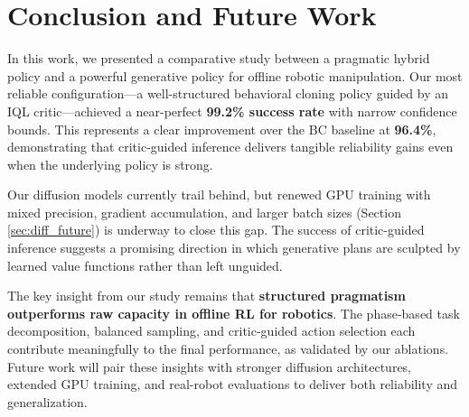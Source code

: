 \documentclass[conference]{IEEEtran}
\begin{document}
\section{Conclusion and Future Work}

In this work, we presented a comparative study between a pragmatic hybrid policy and a powerful generative policy for offline robotic manipulation. Our most reliable configuration---a well-structured behavioral cloning policy guided by an IQL critic---achieved a near-perfect \textbf{99.2\% success rate} with narrow confidence bounds. This represents a clear improvement over the BC baseline at \textbf{96.4\%}, demonstrating that critic-guided inference delivers tangible reliability gains even when the underlying policy is strong.

Our diffusion models currently trail behind, but renewed GPU training with mixed precision, gradient accumulation, and larger batch sizes (Section \ref{sec:diff_future}) is underway to close this gap. The success of critic-guided inference suggests a promising direction in which generative plans are sculpted by learned value functions rather than left unguided.

The key insight from our study remains that \textbf{structured pragmatism outperforms raw capacity in offline RL for robotics}. The phase-based task decomposition, balanced sampling, and critic-guided action selection each contribute meaningfully to the final performance, as validated by our ablations. Future work will pair these insights with stronger diffusion architectures, extended GPU training, and real-robot evaluations to deliver both reliability and generalization.



\end{document}
